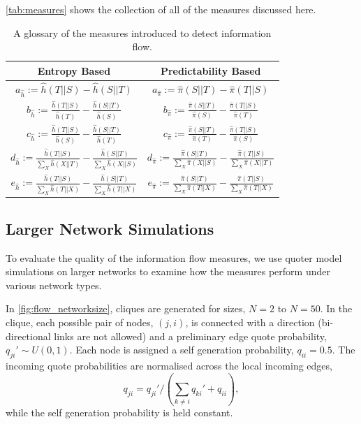 \autoref{tab:measures} shows the collection of all of the measures discussed here. 

\begin{table}[!htbp]
\centering
\begin{tabular}{cc}
 Entropy Based & Predictability Based  \\ 
\toprule
 $ \displaystyle a_{\hat{h}} := \hat{h}(T||S) - \hat{h}(S||T)$ & 
$ \displaystyle a_{\hat{\pi}} := \hat{\pi}(S||T) - \hat{\pi}(T||S)$ \\
\midrule
 $ \displaystyle b_{\hat{h}} := \frac{\hat{h}(T||S)}{\hat{h}(T)} - \frac{\hat{h}(S||T)}{\hat{h}(S)}$ & 
$ \displaystyle b_{\hat{\pi}} := \frac{\hat{\pi}(S||T)}{\hat{\pi}(S)} - \frac{\hat{\pi}(T||S)}{\hat{\pi}(T)}$ \\
 $ \displaystyle c_{\hat{h}} := \frac{\hat{h}(T||S)}{\hat{h}(S)} - \frac{\hat{h}(S||T)}{\hat{h}(T)}$ & 
$ \displaystyle c_{\hat{\pi}} := \frac{\hat{\pi}(S||T)}{\hat{\pi}(T)} - \frac{\hat{\pi}(T||S)}{\hat{\pi}(S)}$ \\
\midrule 
 $ \displaystyle d_{\hat{h}} := \frac{\hat{h}(T||S)}{\sum_X \hat{h}(X||T)} - \frac{\hat{h}(S||T)}{\sum_X \hat{h}(X||S)}$ &
$ \displaystyle d_{\hat{\pi}} := \frac{\hat{\pi}(S||T)}{\sum_X \hat{\pi}(X||S)} - \frac{\hat{\pi}(T||S)}{\sum_X \hat{\pi}(X||T)}$  \\
\addlinespace[0.5ex]
 $ \displaystyle e_{\hat{h}} := \frac{\hat{h}(T||S)}{\sum_X \hat{h}(T||X)} - \frac{\hat{h}(S||T)}{\sum_X \hat{h}(T||X)}$ & 
$ \displaystyle e_{\hat{\pi}} := \frac{\hat{\pi}(S||T)}{\sum_X \hat{\pi}(T||X)} - \frac{\hat{\pi}(T||S)}{\sum_X \hat{\pi}(T||X)}$ \\
\end{tabular}
\caption{A glossary of the measures introduced to detect information flow.}\label{tab:measures}
\end{table}


\subsection{Larger Network Simulations}\label{sec:network_sizes}
To evaluate the quality of the information flow measures, we use quoter model simulations on larger networks to examine how the measures perform under various network types. 

In \autoref{fig:flow_networksize}, cliques are generated for sizes, $N=2$ to $N=50$. In the clique, each possible pair of nodes, $(j,i)$, is connected with a direction (bi-directional links are not allowed) and a preliminary edge quote probability, $q_{ji}' \sim U(0,1)$. Each node is assigned a self generation probability, $q_{ii}=0.5$. The incoming quote probabilities are normalised across the local incoming edges, 
$$q_{ji} = q_{ji}' / \left( \sum_{k\neq i} q_{ki}' + q_{ii} \right),$$
while the self generation probability is held constant. 

